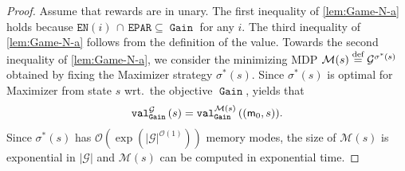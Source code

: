 \documentclass[a4paper,UKenglish,cleveref,autoref,thm-restate]{lipics-v2021}
\DeclareMathOperator{\Gain}{\mathtt{Gain}}
\newcommand{\Eparity}{\mathtt{EPAR}}
\newcommand{\en}{\mathtt{EN}}
\newcommand{\+}[1]{\mathbb{#1}}
\newcommand{\?}[1]{\mathcal{#1}}
\newcommand{\Ocompl}{\?{O}}
\newcommand{\eqby}[2][=]{\stackrel{\text{{\tiny{#2}}}}{#1}}
\newcommand{\eqdef}{\eqby{def}}
\newcommand{\lrc}[1]{\left(#1\right)}
\newcommand{\tuple}[1]{\lrc{#1}}
\newcommand{\game}{{\mathcal G}}
\newcommand{\mdp}{{\mathcal M}}
\newcommand{\s}{s}
\newcommand{\zstrat}{\sigma}
\newcommand{\optzstrat}{\zstrat^*}
\newcommand{\memconf}{{\sf m}}
\newcommand{\initmem}{\memconf_0}
\begin{document}
\begin{proof}
Assume that rewards are in unary.
The first inequality of \eqref{lem:Game-N-a} holds because 
$\en(i)\, \cap\, \Eparity \subseteq \Gain$ for any $i$.
The third inequality of \eqref{lem:Game-N-a} follows from the definition of
the value.
Towards the second inequality of \eqref{lem:Game-N-a},
we consider the minimizing MDP
$\mdp(\s) \eqdef \game^{\optzstrat(\s)}$ 
obtained by fixing the Maximizer strategy $\optzstrat(\s)$.
Since $\optzstrat(\s)$ is optimal for Maximizer from state $\s$
wrt.\ the objective $\Gain$,  yields that
\begin{equation}\label{eq:lem:Game-N-1}
\valueof[\game][\Gain]{\s} = \valueof[\mdp(\s)][\Gain]{\tuple{\initmem,\s}}.
\end{equation}
Since $\optzstrat(\s)$ has $\Ocompl(\exp(|\game|^{\Ocompl(1)}))$ memory modes,
the size of $\mdp(\s)$ is exponential in $|\game|$ and $\mdp(\s)$ can be computed in
exponential time.


\end{proof}
\end{document}
